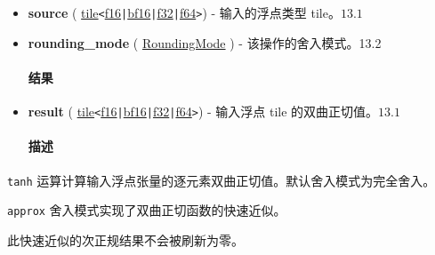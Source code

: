 \documentclass{article}
\begin{document}
\begin{itemize}
\item \textbf{source} ( \href{https://docs.nvidia.com/cuda/tile-ir/latest/sections/types.html#type-tile}{tile}\texttt{<}\href{https://docs.nvidia.com/cuda/tile-ir/latest/sections/types.html#subsection-element-types}{f16}\texttt{|}\href{https://docs.nvidia.com/cuda/tile-ir/latest/sections/types.html#subsection-element-types}{bf16}\texttt{|}\href{https://docs.nvidia.com/cuda/tile-ir/latest/sections/types.html#subsection-element-types}{f32}\texttt{|}\href{https://docs.nvidia.com/cuda/tile-ir/latest/sections/types.html#subsection-element-types}{f64}\texttt{>}) - 输入的浮点类型 tile。$\boxed{13.1}$
\item \textbf{rounding\_mode} ( \href{https://docs.nvidia.com/cuda/tile-ir/latest/sections/operations.html#op-attribute-cuda-tile-tanh-roundingmode-attr}{RoundingMode} ) - 该操作的舍入模式。13.2




\paragraph{结果}


\item \textbf{result} ( \href{https://docs.nvidia.com/cuda/tile-ir/latest/sections/types.html#type-tile}{tile}\texttt{<}\href{https://docs.nvidia.com/cuda/tile-ir/latest/sections/types.html#subsection-element-types}{f16}\texttt{|}\href{https://docs.nvidia.com/cuda/tile-ir/latest/sections/types.html#subsection-element-types}{bf16}\texttt{|}\href{https://docs.nvidia.com/cuda/tile-ir/latest/sections/types.html#subsection-element-types}{f32}\texttt{|}\href{https://docs.nvidia.com/cuda/tile-ir/latest/sections/types.html#subsection-element-types}{f64}\texttt{>}) - 输入浮点 tile 的双曲正切值。$\boxed{13.1}$




\paragraph{描述}


\end{itemize}
\texttt{tanh} 运算计算输入浮点张量的逐元素双曲正切值。默认舍入模式为完全舍入。



\texttt{approx} 舍入模式实现了双曲正切函数的快速近似。

此快速近似的次正规结果不会被刷新为零。
\end{document}
